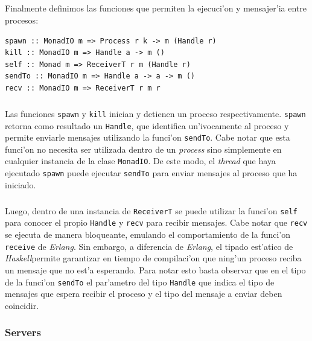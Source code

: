 \documentclass[a4paper]{article}
\newcommand{\haskell}{\textsl{Haskell}}
\begin{document}
\subparagraph{}Finalmente definimos las funciones que permiten la ejecuci'on y mensajer'ia entre procesos:
\begin{center}\begin{lstlisting}
spawn :: MonadIO m => Process r k -> m (Handle r)
kill :: MonadIO m => Handle a -> m ()
self :: Monad m => ReceiverT r m (Handle r)
sendTo :: MonadIO m => Handle a -> a -> m ()
recv :: MonadIO m => ReceiverT r m r
\end{lstlisting}\end{center}
\subparagraph{}Las funciones \texttt{spawn} y \texttt{kill} inician y detienen un proceso respectivamente.  \texttt{spawn} retorna como resultado un \texttt{Handle}, que identifica un'ivocamente al proceso y permite enviarle mensajes utilizando la funci'on \texttt{sendTo}.  Cabe notar que esta funci'on no necesita ser utilizada dentro de un \textsl{process} sino simplemente en cualquier instancia de la clase \texttt{MonadIO}.  De este modo, el \textsl{thread} que haya ejecutado \texttt{spawn} puede ejecutar \texttt{sendTo} para enviar mensajes al proceso que ha iniciado.
\subparagraph{}Luego, dentro de una instancia de \texttt{ReceiverT} se puede utilizar la funci'on \texttt{self} para conocer el propio \texttt{Handle} y \texttt{recv} para recibir mensajes.  Cabe notar que \texttt{recv} se ejecuta de manera bloqueante, emulando el comportamiento de la funci'on \texttt{receive} de \textsl{Erlang}.  Sin embargo, a diferencia de \textsl{Erlang}, el tipado est'atico de \haskell permite garantizar en tiempo de compilaci'on que ning'un proceso reciba un mensaje que no est'a esperando.   Para notar esto basta observar que en el tipo de la funci'on \texttt{sendTo} el par'ametro del tipo \texttt{Handle} que indica el tipo de mensajes que espera recibir el proceso y el tipo del mensaje a enviar deben coincidir.

\newpage
\subsubsection{Servers}
\end{document}
